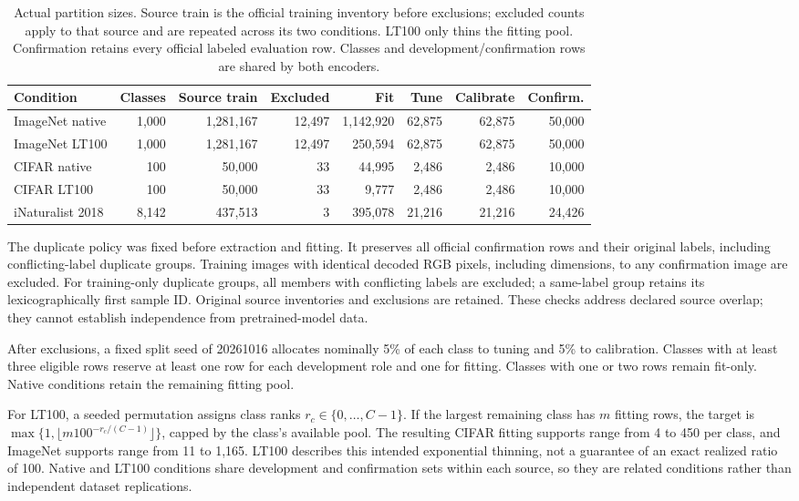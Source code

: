 \documentclass[conference]{IEEEtran}
\begin{document}
\begin{table}[t]
\centering\footnotesize
\caption{Actual partition sizes. Source train is the official training inventory before exclusions; excluded counts apply to that source and are repeated across its two conditions. LT100 only thins the fitting pool. Confirmation retains every official labeled evaluation row. Classes and development/confirmation rows are shared by both encoders.}
\label{tab:data}
\begin{tabular}{lrrrrrrr}
\toprule
Condition & Classes & Source train & Excluded & Fit & Tune & Calibrate & Confirm. \\
\midrule
ImageNet native & 1,000 & 1,281,167 & 12,497 & 1,142,920 & 62,875 & 62,875 & 50,000 \\
ImageNet LT100 & 1,000 & 1,281,167 & 12,497 & 250,594 & 62,875 & 62,875 & 50,000 \\
CIFAR native & 100 & 50,000 & 33 & 44,995 & 2,486 & 2,486 & 10,000 \\
CIFAR LT100 & 100 & 50,000 & 33 & 9,777 & 2,486 & 2,486 & 10,000 \\
iNaturalist 2018 & 8,142 & 437,513 & 3 & 395,078 & 21,216 & 21,216 & 24,426 \\
\bottomrule
\end{tabular}
\end{table}

The duplicate policy was fixed before extraction and fitting. It preserves all official confirmation rows and their original labels, including conflicting-label duplicate groups. Training images with identical decoded RGB pixels, including dimensions, to any confirmation image are excluded. For training-only duplicate groups, all members with conflicting labels are excluded; a same-label group retains its lexicographically first sample ID. Original source inventories and exclusions are retained. These checks address declared source overlap; they cannot establish independence from pretrained-model data.

After exclusions, a fixed split seed of 20261016 allocates nominally 5\% of each class to tuning and 5\% to calibration. Classes with at least three eligible rows reserve at least one row for each development role and one for fitting. Classes with one or two rows remain fit-only. Native conditions retain the remaining fitting pool.

For LT100, a seeded permutation assigns class ranks $r_c\in\{0,\ldots,C-1\}$. If the largest remaining class has $m$ fitting rows, the target is $\max\{1,\lfloor m100^{-r_c/(C-1)}\rfloor\}$, capped by the class's available pool. The resulting CIFAR fitting supports range from 4 to 450 per class, and ImageNet supports range from 11 to 1,165. LT100 describes this intended exponential thinning, not a guarantee of an exact realized ratio of 100. Native and LT100 conditions share development and confirmation sets within each source, so they are related conditions rather than independent dataset replications.
\end{document}
